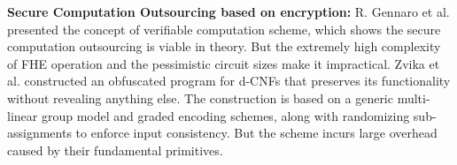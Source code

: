 \documentclass[runningheads,a4paper]{llncs}
\begin{document}
\textbf{Secure Computation Outsourcing based on encryption:}
R. Gennaro et al.\cite{t16} presented the concept of verifiable computation scheme, 
which shows the secure computation outsourcing is viable in theory. 
But the extremely high complexity of FHE operation and the pessimistic circuit sizes make it impractical.
Zvika et al.\cite{t12} constructed an obfuscated program for d-CNFs that preserves its functionality without revealing anything else. 
The construction is based on a generic multi-linear group model and graded encoding schemes, 
along with randomizing sub-assignments to enforce input consistency. 
But the scheme incurs large overhead caused by their fundamental primitives.
\end{document}
